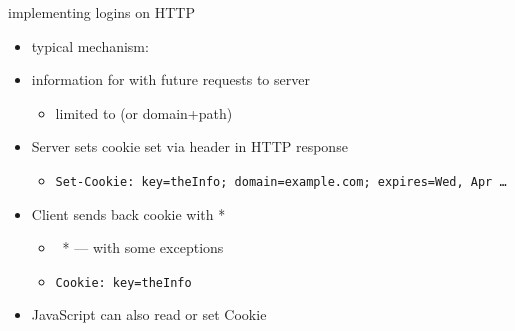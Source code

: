
\begin{frame}{implementing logins on HTTP}
    \begin{itemize}
        \item typical mechanism: 
        \item information for  with future requests to server
        \begin{itemize}
            \item limited to  (or domain+path)
        \end{itemize}
    \item Server sets cookie set via header in HTTP response
        \begin{itemize}
            \item \texttt{\fontsize{10}{10}\selectfont Set-Cookie: key=theInfo; domain=example.com; expires=Wed, Apr \ldots}
        \end{itemize}
    \item Client sends back cookie with *
        \begin{itemize}
            \item ~* --- with some exceptions
            \item \texttt{\fontsize{10}{10}\selectfont Cookie: key=theInfo}
        \end{itemize}
    \item JavaScript can also read or set Cookie
    \end{itemize}
\end{frame}
